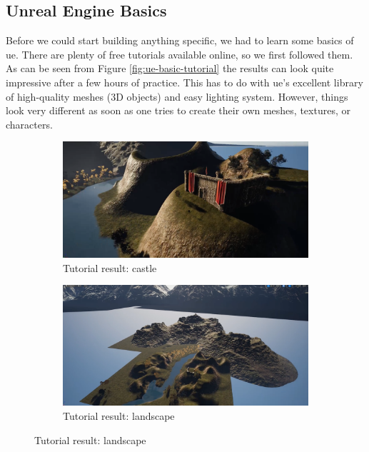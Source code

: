 \documentclass[
  a4paper,  %
  twoside,  %
  bibliography=totoc,
  headsepline,
  cleardoublepage=empty,
  parskip=half,
  draft=false
]{scrbook}
\begin{document}
\subsection*{Unreal Engine Basics}

Before we could start building anything specific, we had to learn some basics of \gls{ue}. There are plenty of free tutorials available online, so we first followed them. As can be seen from Figure \ref{fig:ue-basic-tutorial} the results can look quite impressive after a few hours of practice. This has to do with \gls{ue}'s excellent library of high-quality meshes (3D objects) and easy lighting system. However, things look very different as soon as one tries to create their own meshes, textures, or characters.

\begin{figure}[h]
  \centering
  \begin{subfigure}{0.45\textwidth}
    \includegraphics[width=\linewidth]{graphics/images/unreal-engine/Basics/Landscape-Castle.png}
    \caption{Tutorial result: castle}
  \end{subfigure}
  \begin{subfigure}{0.45\textwidth}
    \includegraphics[width=\linewidth]{graphics/images/unreal-engine/Basics/Landscape-Overview.png}
    \caption{Tutorial result: landscape}
  \end{subfigure}


\end{figure}
\end{document}
